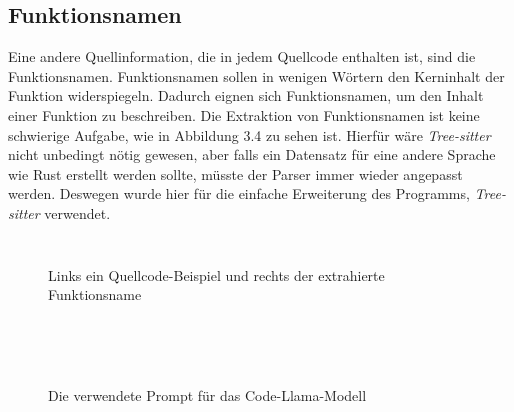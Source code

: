 \documentclass[12pt,letterpaper,ngerman]{article}
\begin{document}
\subsection{Funktionsnamen}
Eine andere Quellinformation, die in jedem Quellcode enthalten ist,
sind die Funktionsnamen. Funktionsnamen sollen in wenigen Wörtern 
den Kerninhalt der Funktion widerspiegeln. Dadurch eignen sich 
Funktionsnamen, um den Inhalt einer Funktion zu beschreiben. 
Die Extraktion von Funktionsnamen ist keine schwierige Aufgabe, 
wie in Abbildung 3.4 zu sehen ist.
Hierfür wäre \textit{Tree-sitter} nicht unbedingt nötig gewesen, 
aber falls ein 
Datensatz für eine andere Sprache wie Rust erstellt werden sollte,
müsste der Parser immer wieder angepasst werden.
Deswegen wurde hier für die einfache Erweiterung des Programms,
\textit{Tree-sitter} verwendet. 
%
\begin{figure}
  \begin{center}
    \begin{minipage}[c]{6cm}
        \centering
        \inputminted[fontsize=\scriptsize]{c}{comments.c}
    \end{minipage}
    \hspace{0.1cm}
    \begin{minipage}[c]{6cm}
        \centering
        \inputminted[fontsize=\scriptsize]{json}{names.json}
    \end{minipage}
  \end{center}
  \caption{Links ein Quellcode-Beispiel und rechts der extrahierte Funktionsname}
\end{figure}

\hfill\\
\pagebreak
\hfill\\

\begin{figure}
  \begin{center}
    \begin{minipage}[c]{6cm}
        \centering
        \inputminted[fontsize=\footnotesize]{python}{prompt.py}
    \end{minipage}
  \end{center}
  \caption{Die verwendete Prompt für das Code-Llama-Modell }
\end{figure}
\end{document}
